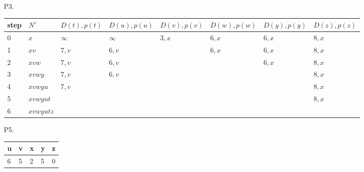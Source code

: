 \documentclass{article}
\begin{document}
\begin{enumerate}
    \item[P3.] \begin{tabular}{@{}llllllll@{}}
        \toprule
        step & $N'$ & $D(t),p(t)$ & $D(u),p(u)$ & $D(v),p(v)$ & $D(w),p(w)$ & $D(y),p(y)$ & $D(z),p(z)$ \\ \midrule
        0 & $x$ & $\infty$ & $\infty$ & $3,x$ & $6,x$ & $6,x$ & $8,x$ \\
        1 & $xv$ & $7,v$ & $6,v$ &  & $6,x$ & $6,x$ & $8,x$ \\
        2 & $xvw$ & $7,v$ & $6,v$ &  &  & $6,x$ & $8,x$ \\
        3 & $xvwy$ & $7,v$ & $6,v$ &  &  &  & $8,x$ \\
        4 & $xvwyu$ & $7,v$ &  &  &  &  & $8,x$ \\
        5 & $xvwyut$ &  &  &  &  &  & $8,x$ \\
        6 & $xvwyutz$ &  &  &  &  &  &  \\ \bottomrule
    \end{tabular}

    \item[P5.] \begin{tabular}{@{}lllll@{}}
        \toprule
        u & v & x & y & z \\ \midrule
        6 & 5 & 2 & 5 & 0 \\ \bottomrule
    \end{tabular}
\end{enumerate}
\end{document}
